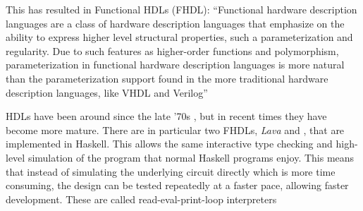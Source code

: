 		This has resulted in Functional HDLs (FHDL): ``Functional hardware
		description languages are a class of hardware description languages
		that emphasize on the ability to express higher level structural
		properties, such a parameterization and regularity. Due to such
		features as higher-order functions and polymorphism, parameterization
		in functional hardware description languages is more natural than the
		parameterization support found in the more traditional hardware
		description languages, like VHDL and Verilog'' \cite{Baaij2009}
		
		HDLs have been around since the late '70s \cite{Chen2012},
		but in recent times they have become more mature\cite{TODO}. There are in
		particular two FHDLs, \emph{Lava} and \clash \cite{Baaij2009,
		Bjesse1998}, that are implemented in Haskell.  This allows the same
		interactive type checking and high-level simulation of the program that
		normal Haskell programs enjoy. This means that instead of simulating
		the underlying circuit directly which is more time consuming, the
		design can be tested repeatedly at a faster pace, allowing faster development. These are called read-eval-print-loop interpreters
